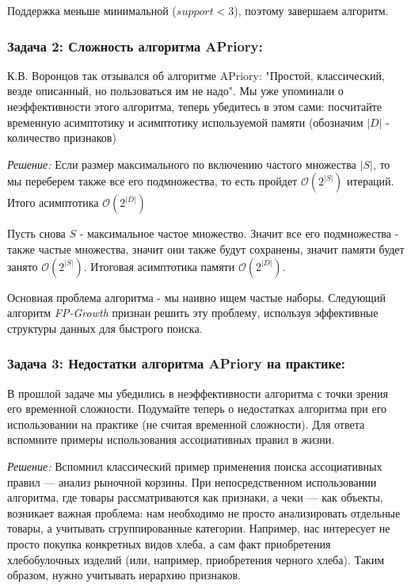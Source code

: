 Поддержка меньше минимальной (\( support < 3 \)), поэтому завершаем алгоритм.

\subsubsection{Задача 2: Сложность алгоритма APriory:} К.В. Воронцов так отзывался об алгоритме APriory: "Простой, классический, везде описанный, но пользоваться им не надо". Мы уже упоминали о неэффективности этого алгоритма, теперь убедитесь в этом сами: посчитайте временную асимптотику и асимптотику используемой памяти (обозначим \(|D|\) - количество признаков)


\textit{Решение:} Если размер максимального по включению частого множества \(|S|\), то мы переберем также все его подмножества, то есть пройдет \(\mathcal{O}(2^{|S|})\) итераций. Итого асимптотика \(\mathcal{O}(2^{|D|})\)

Пусть снова \(S\) - максимальное частое множество. Значит все его подмножества - также частые множества, значит они также будут сохранены, значит памяти будет занято \(\mathcal{O}(2^{|S|})\). Итоговая асимптотика памяти \(\mathcal{O}(2^{|D|})\).

Основная проблема алгоритма - мы наивно ищем частые наборы. Следующий алгоритм \textit{FP-Growth} признан решить эту проблему, используя эффективные структуры данных для быстрого поиска.

\subsubsection{Задача 3: Недостатки алгоритма APriory на практике:} В прошлой задаче мы убедились в неэффективности алгоритма с точки зрения его временной сложности. Подумайте теперь о недостатках алгоритма при его использовании на практике (не считая временной сложности). Для ответа вспомните примеры использования ассоциативных правил в жизни.

\textit{Решение:} Вспомнил классический пример применения поиска ассоциативных правил — анализ рыночной корзины. При непосредственном использовании алгоритма, где товары рассматриваются как признаки, а чеки — как объекты, возникает важная проблема: нам необходимо не просто анализировать отдельные товары, а учитывать сгруппированные категории. Например, нас интересует не просто покупка конкретных видов хлеба, а сам факт приобретения хлебобулочных изделий (или, например, приобретения черного хлеба). Таким образом, нужно учитывать иерархию признаков.

